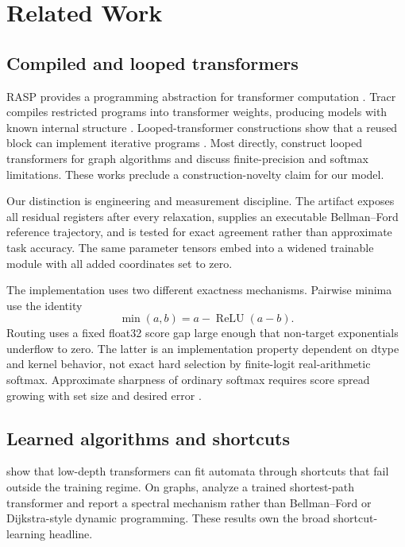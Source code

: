 \documentclass[10pt,twocolumn]{article}
\begin{document}
\section{Related Work}

\subsection{Compiled and looped transformers}

RASP provides a programming abstraction for transformer computation
\citep{weiss2021rasp}. Tracr compiles restricted programs into transformer
weights, producing models with known internal structure
\citep{lindner2023tracr}. Looped-transformer constructions show that a reused
block can implement iterative programs \citep{giannou2023looped}. Most
directly, \citet{deluca2024simulation} construct looped transformers for graph
algorithms and discuss finite-precision and softmax limitations. These works
preclude a construction-novelty claim for our model.

Our distinction is engineering and measurement discipline. The artifact
exposes all residual registers after every relaxation, supplies an executable
Bellman--Ford reference trajectory, and is tested for exact agreement rather
than approximate task accuracy. The same parameter tensors embed into a
widened trainable module with all added coordinates set to zero.

The implementation uses two different exactness mechanisms. Pairwise minima
use the identity
\begin{equation}
  \min(a,b)=a-\operatorname{ReLU}(a-b).
  \label{eq:relu-min}
\end{equation}
Routing uses a fixed float32 score gap large enough that non-target
exponentials underflow to zero. The latter is an implementation property
dependent on dtype and kernel behavior, not exact hard selection by
finite-logit real-arithmetic softmax. Approximate sharpness of ordinary
softmax requires score spread growing with set size and desired error
\citep{velickovic2025softmax}.

\subsection{Learned algorithms and shortcuts}

\citet{liu2022shortcuts} show that low-depth transformers can fit automata
through shortcuts that fail outside the training regime. On graphs,
\citet{cohen2025spectral} analyze a trained shortest-path transformer and
report a spectral mechanism rather than Bellman--Ford or Dijkstra-style
dynamic programming. These results own the broad shortcut-learning headline.
\end{document}
